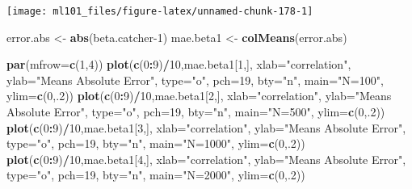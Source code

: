 \documentclass[]{article}
\newenvironment{Shaded}{\begin{snugshade}}{\end{snugshade}}
\newcommand{\DataTypeTok}[1]{\textcolor[rgb]{0.13,0.29,0.53}{#1}}
\newcommand{\DecValTok}[1]{\textcolor[rgb]{0.00,0.00,0.81}{#1}}
\newcommand{\KeywordTok}[1]{\textcolor[rgb]{0.13,0.29,0.53}{\textbf{#1}}}
\newcommand{\NormalTok}[1]{#1}
\newcommand{\OperatorTok}[1]{\textcolor[rgb]{0.81,0.36,0.00}{\textbf{#1}}}
\newcommand{\StringTok}[1]{\textcolor[rgb]{0.31,0.60,0.02}{#1}}
\begin{document}
\begin{center}\texttt{[image: ml101\_files/figure-latex/unnamed-chunk-178-1]} \end{center}

\begin{Shaded}
\begin{Highlighting}[]
\NormalTok{error.abs <-}\StringTok{ }\KeywordTok{abs}\NormalTok{(beta.catcher}\DecValTok{-1}\NormalTok{)}
\NormalTok{mae.beta1 <-}\StringTok{ }\KeywordTok{colMeans}\NormalTok{(error.abs)}

\KeywordTok{par}\NormalTok{(}\DataTypeTok{mfrow=}\KeywordTok{c}\NormalTok{(}\DecValTok{1}\NormalTok{,}\DecValTok{4}\NormalTok{))}
\KeywordTok{plot}\NormalTok{(}\KeywordTok{c}\NormalTok{(}\DecValTok{0}\OperatorTok{:}\DecValTok{9}\NormalTok{)}\OperatorTok{/}\DecValTok{10}\NormalTok{,mae.beta1[}\DecValTok{1}\NormalTok{,], }\DataTypeTok{xlab=}\StringTok{"correlation"}\NormalTok{, }\DataTypeTok{ylab=}\StringTok{"Means Absolute Error"}\NormalTok{, }\DataTypeTok{type=}\StringTok{"o"}\NormalTok{, }\DataTypeTok{pch=}\DecValTok{19}\NormalTok{, }\DataTypeTok{bty=}\StringTok{"n"}\NormalTok{, }\DataTypeTok{main=}\StringTok{"N=100"}\NormalTok{, }\DataTypeTok{ylim=}\KeywordTok{c}\NormalTok{(}\DecValTok{0}\NormalTok{,.}\DecValTok{2}\NormalTok{))}
\KeywordTok{plot}\NormalTok{(}\KeywordTok{c}\NormalTok{(}\DecValTok{0}\OperatorTok{:}\DecValTok{9}\NormalTok{)}\OperatorTok{/}\DecValTok{10}\NormalTok{,mae.beta1[}\DecValTok{2}\NormalTok{,], }\DataTypeTok{xlab=}\StringTok{"correlation"}\NormalTok{, }\DataTypeTok{ylab=}\StringTok{"Means Absolute Error"}\NormalTok{, }\DataTypeTok{type=}\StringTok{"o"}\NormalTok{, }\DataTypeTok{pch=}\DecValTok{19}\NormalTok{, }\DataTypeTok{bty=}\StringTok{"n"}\NormalTok{, }\DataTypeTok{main=}\StringTok{"N=500"}\NormalTok{, }\DataTypeTok{ylim=}\KeywordTok{c}\NormalTok{(}\DecValTok{0}\NormalTok{,.}\DecValTok{2}\NormalTok{))}
\KeywordTok{plot}\NormalTok{(}\KeywordTok{c}\NormalTok{(}\DecValTok{0}\OperatorTok{:}\DecValTok{9}\NormalTok{)}\OperatorTok{/}\DecValTok{10}\NormalTok{,mae.beta1[}\DecValTok{3}\NormalTok{,], }\DataTypeTok{xlab=}\StringTok{"correlation"}\NormalTok{, }\DataTypeTok{ylab=}\StringTok{"Means Absolute Error"}\NormalTok{, }\DataTypeTok{type=}\StringTok{"o"}\NormalTok{, }\DataTypeTok{pch=}\DecValTok{19}\NormalTok{, }\DataTypeTok{bty=}\StringTok{"n"}\NormalTok{, }\DataTypeTok{main=}\StringTok{"N=1000"}\NormalTok{, }\DataTypeTok{ylim=}\KeywordTok{c}\NormalTok{(}\DecValTok{0}\NormalTok{,.}\DecValTok{2}\NormalTok{))}
\KeywordTok{plot}\NormalTok{(}\KeywordTok{c}\NormalTok{(}\DecValTok{0}\OperatorTok{:}\DecValTok{9}\NormalTok{)}\OperatorTok{/}\DecValTok{10}\NormalTok{,mae.beta1[}\DecValTok{4}\NormalTok{,], }\DataTypeTok{xlab=}\StringTok{"correlation"}\NormalTok{, }\DataTypeTok{ylab=}\StringTok{"Means Absolute Error"}\NormalTok{, }\DataTypeTok{type=}\StringTok{"o"}\NormalTok{, }\DataTypeTok{pch=}\DecValTok{19}\NormalTok{, }\DataTypeTok{bty=}\StringTok{"n"}\NormalTok{, }\DataTypeTok{main=}\StringTok{"N=2000"}\NormalTok{, }\DataTypeTok{ylim=}\KeywordTok{c}\NormalTok{(}\DecValTok{0}\NormalTok{,.}\DecValTok{2}\NormalTok{))}
\end{Highlighting}
\end{Shaded}
\end{document}
